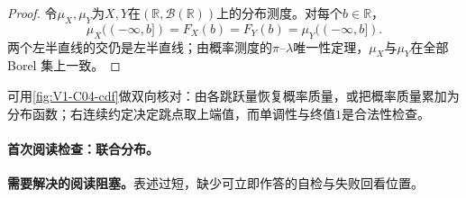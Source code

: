 \documentclass[UTF8,a4paper,11pt,openany]{ctexbook}
\begin{document}
\setcounter{page}{66}
\setcounter{chapter}{4}
\setcounter{figure}{0}
\pagestyle{headings}
\begin{proof}
令$\mu_X,\mu_Y$为$X,Y$在$(\mathbb R,\mathcal B(\mathbb R))$上的分布测度。对每个$b\in\mathbb R$，
\[
\mu_X(( -\infty,b])=F_X(b)=F_Y(b)=\mu_Y(( -\infty,b]).
\]
两个左半直线的交仍是左半直线；由概率测度的$\pi$--$\lambda$唯一性定理，$\mu_X$与$\mu_Y$在全部 Borel 集上一致。
\end{proof}

可用\cref{fig:V1-C04-cdf}做双向核对：由各跳跃量恢复概率质量，或把概率质量累加为分布函数；右连续约定决定跳点取上端值，而单调性与终值$1$是合法性检查。
\paragraph{首次阅读检查：联合分布。}\textbf{需要解决的阅读阻塞。}表述过短，缺少可立即作答的自检与失败回看位置。
\end{document}
